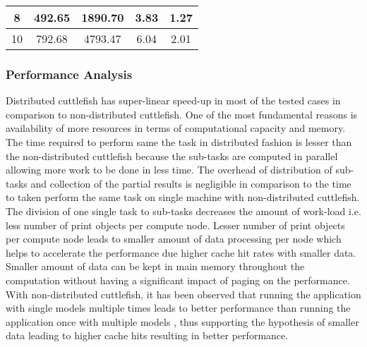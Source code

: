 \begin{table}
\begin{tabular}{|c|c|c|c|c|}
8                                                                                                                            & 492.65                                                                                                                                              & 1890.70                                                                                                              & 3.83       & 1.27                 \\ \hline
10                                                                                                                           & 792.68                                                                                                                                              & 4793.47                                                                                                               & 6.04       & 2.01                 \\ \hline
\end{tabular}
\end{table}


\subsubsection{Performance Analysis}

Distributed cuttlefish has super-linear speed-up in most of the tested cases in comparison to non-distributed cuttlefish. One of the most fundamental reasons is availability of more resources in terms of computational capacity and memory. The time required to perform same the task in distributed fashion is lesser than the non-distributed cuttlefish because the sub-tasks are computed in parallel allowing more work to be done in less time. The overhead of distribution of sub-tasks and collection of the partial results is negligible in comparison to the time to taken perform the same task on single machine with non-distributed cuttlefish. The division of one single task to sub-tasks decreases the amount of work-load  i.e. less number of print objects per compute node. Lesser number of print objects per compute node leads to smaller amount of data processing per node which helps to accelerate the performance due higher cache hit rates with smaller data. Smaller amount of data can be kept in main memory throughout the computation without having a significant impact of paging on the performance. With non-distributed cuttlefish, it has been observed that running the application with single models multiple times leads to better performance than running the application once with multiple models \cite{perComm}, thus supporting the hypothesis of smaller data leading to higher cache hits resulting in better performance. \newline

